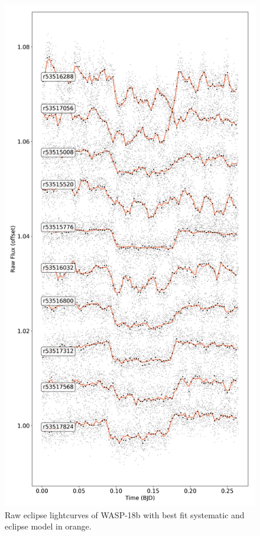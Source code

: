 \begin{subappendices}
\begin{figure}
    \centering
    \includegraphics[height=0.8\textheight]{Rawlightcurves_W18b.png}
    \caption{Raw eclipse lightcurves of WASP-18b with best fit systematic and eclipse model in orange.}
    \label{P3:fig:rawlcs}
\end{figure}


\end{subappendices}
